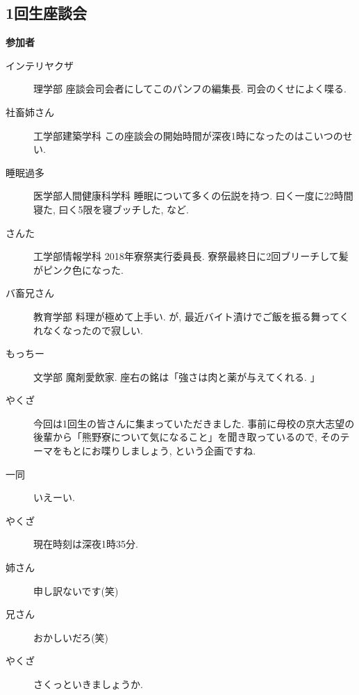 \documentclass[10pt,b5jsbook,dvips,dvipdfmx,openany]{jsbook}
\theoremstyle{definition}
\begin{document}
	\setcounter{footnote}{0}

		\subsection{1回生座談会}

		\begin{itembox}[l]{\bf 参加者}
		\begin{description}
		\item[インテリヤクザ] 理学部 座談会司会者にしてこのパンフの編集長. 司会のくせによく喋る.
		\item[社畜姉さん]工学部建築学科 この座談会の開始時間が深夜1時になったのはこいつのせい.
		\item[睡眠過多] 医学部人間健康科学科 睡眠について多くの伝説を持つ. 曰く一度に22時間寝た, 曰く5限を寝ブッチした, など.
		\item[さんた] 工学部情報学科 2018年寮祭実行委員長. 寮祭最終日に2回ブリーチして髪がピンク色になった.
		\item[バ畜兄さん] 教育学部 料理が極めて上手い. が, 最近バイト漬けでご飯を振る舞ってくれなくなったので寂しい.
		\item[もっちー] 文学部 魔剤愛飲家. 座右の銘は「強さは肉と薬が与えてくれる. 」
		\end{description}
		\end{itembox}
\small
		\begin{description}
		\item[やくざ] 今回は1回生の皆さんに集まっていただきました. 事前に母校の京大志望の後輩から「熊野寮について気になること」を聞き取っているので, そのテーマをもとにお喋りしましょう, という企画ですね.
		\item[ 一同 ] いえーい.
		\item[やくざ] 現在時刻は深夜1時35分.
		\item[姉さん] 申し訳ないです(笑)
		\item[兄さん] おかしいだろ(笑)
		\item[やくざ] さくっといきましょうか.
		\end{description}
\end{document}

